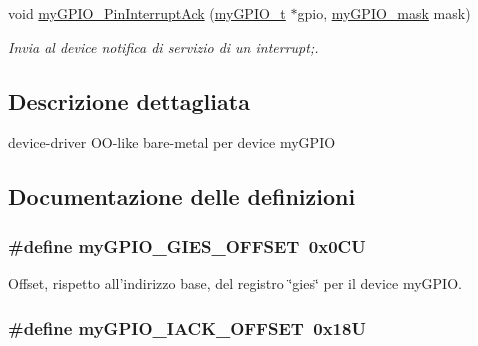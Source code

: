 \begin{DoxyCompactItemize}
void \hyperlink{group__bare-metal_gab6ad3dda867515825890c97dbf6f55db}{my\+G\+P\+I\+O\+\_\+\+Pin\+Interrupt\+Ack} (\hyperlink{structmy_g_p_i_o__t}{my\+G\+P\+I\+O\+\_\+t} $\ast$gpio, \hyperlink{group__bare-metal_ga402a0d20afc0cb7c25554b8b023f4253}{my\+G\+P\+I\+O\+\_\+mask} mask)
\begin{DoxyCompactList}\small\item\em Invia al device notifica di servizio di un interrupt;. \end{DoxyCompactList}\end{DoxyCompactItemize}


\subsection{Descrizione dettagliata}
device-\/driver O\+O-\/like bare-\/metal per device my\+G\+P\+I\+O 



\subsection{Documentazione delle definizioni}
\hypertarget{group__bare-metal_gad251e4d87d464525d4a2858977468994}{
\subsubsection[{my\+G\+P\+I\+O\+\_\+\+G\+I\+E\+S\+\_\+\+O\+F\+F\+S\+E\+T}]{\setlength{\rightskip}{0pt plus 5cm}\#define my\+G\+P\+I\+O\+\_\+\+G\+I\+E\+S\+\_\+\+O\+F\+F\+S\+E\+T~0x0\+C\+U}}\label{group__bare-metal_gad251e4d87d464525d4a2858977468994}


Offset, rispetto all'indirizzo base, del registro \char`\"{}gies\char`\"{} per il device my\+G\+P\+I\+O. 

\hypertarget{group__bare-metal_gadfca866ac50c2dae09c3c46ad80670fc}{
\subsubsection[{my\+G\+P\+I\+O\+\_\+\+I\+A\+C\+K\+\_\+\+O\+F\+F\+S\+E\+T}]{\setlength{\rightskip}{0pt plus 5cm}\#define my\+G\+P\+I\+O\+\_\+\+I\+A\+C\+K\+\_\+\+O\+F\+F\+S\+E\+T~0x18\+U}}\label{group__bare-metal_gadfca866ac50c2dae09c3c46ad80670fc}


